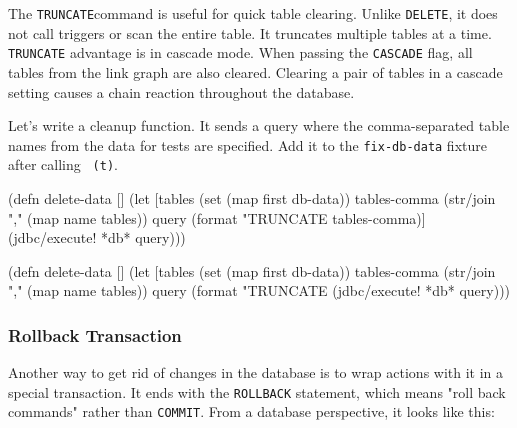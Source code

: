 
The \verb|TRUNCATE|command is useful for quick table clearing. Unlike \verb|DELETE|, it does not call triggers or scan the entire table. It truncates multiple tables at a time. \verb|TRUNCATE| advantage is in cascade mode. When passing the \verb|CASCADE| flag, all tables from the link graph are also cleared. Clearing a pair of tables in a cascade setting causes a chain reaction throughout the database.


Let's write a cleanup function. It sends a query where the comma-separated table names from the data for tests are specified. Add it to the \verb|fix-db-data| fixture after
calling \verb| (t)|.

\ifnarrow

\begin{english}
  \begin{clojure}
(defn delete-data []
  (let [tables (set (map first db-data))
        tables-comma
        (str/join "," (map name tables))
        query
        (format "TRUNCATE %
          tables-comma)]
    (jdbc/execute! *db* query)))
  \end{clojure}
\end{english}

\else

\begin{english}
  \begin{clojure}
(defn delete-data []
  (let [tables (set (map first db-data))
        tables-comma (str/join "," (map name tables))
        query (format "TRUNCATE %
    (jdbc/execute! *db* query)))
  \end{clojure}
\end{english}

\fi

\subsubsection*{Rollback Transaction}



Another way to get rid of changes in the database is to wrap actions with it in a special transaction. It ends with the \verb|ROLLBACK| statement, which means "roll back commands" rather than \verb|COMMIT|. From a database perspective, it looks like this:

